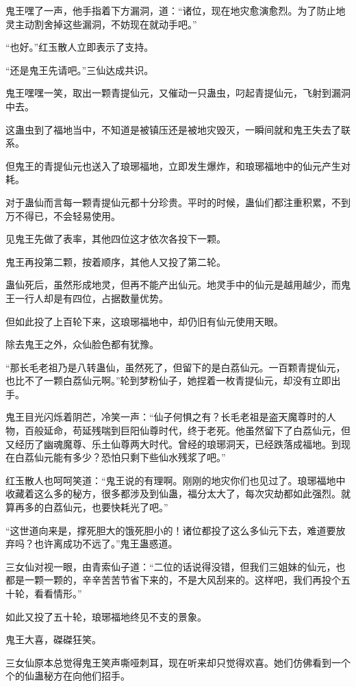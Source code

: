 \begin{this_body}
鬼王嘿了一声，他手指着下方漏洞，道：“诸位，现在地灾愈演愈烈。为了防止地灵主动割舍掉这些漏洞，不妨现在就动手吧。”

“也好。”红玉散人立即表示了支持。

“还是鬼王先请吧。”三仙达成共识。

鬼王嘿嘿一笑，取出一颗青提仙元，又催动一只蛊虫，叼起青提仙元，飞射到漏洞中去。

这蛊虫到了福地当中，不知道是被镇压还是被地灾毁灭，一瞬间就和鬼王失去了联系。

但鬼王的青提仙元也送入了琅琊福地，立即发生爆炸，和琅琊福地中的仙元产生对耗。

对于蛊仙而言每一颗青提仙元都十分珍贵。平时的时候，蛊仙们都注重积累，不到万不得已，不会轻易使用。

见鬼王先做了表率，其他四位这才依次各投下一颗。

鬼王再投第二颗，按着顺序，其他人又投了第二轮。

蛊仙死后，虽然形成地灵，但再不能产出仙元。地灵手中的仙元是越用越少，而鬼王一行人却是有四位，占据数量优势。

但如此投了上百轮下来，这琅琊福地中，却仍旧有仙元使用天眼。

除去鬼王之外，众仙脸色都有犹豫。

“那长毛老祖乃是八转蛊仙，虽然死了，但留下的是白荔仙元。一百颗青提仙元，也比不了一颗白荔仙元啊。”轮到梦粉仙子，她捏着一枚青提仙元，却没有立即出手。

鬼王目光闪烁着阴芒，冷笑一声：“仙子何惧之有？长毛老祖是盗天魔尊时的人物，百般延命，苟延残喘到巨阳仙尊时代，终于老死。他虽然留下了白荔仙元，但又经历了幽魂魔尊、乐土仙尊两大时代。曾经的琅琊洞天，已经跌落成福地。到现在白荔仙元能有多少？恐怕只剩下些仙水残浆了吧。”

红玉散人也呵呵笑道：“鬼王说的有理啊。刚刚的地灾你们也见过了。琅琊福地中收藏着这么多的秘方，很多都涉及到仙蛊，福分太大了，每次灾劫都如此强烈。就算再多的白荔仙元，也要快耗光了吧。”

“这世道向来是，撑死胆大的饿死胆小的！诸位都投了这么多仙元下去，难道要放弃吗？也许离成功不远了。”鬼王蛊惑道。

三女仙对视一眼，由青索仙子道：“二位的话说得没错，但我们三姐妹的仙元，也都是一颗一颗的，辛辛苦苦节省下来的，不是大风刮来的。这样吧，我们再投个五十轮，看看情形。”

如此又投了五十轮，琅琊福地终见不支的景象。

鬼王大喜，磔磔狂笑。

三女仙原本总觉得鬼王笑声嘶哑刺耳，现在听来却只觉得欢喜。她们仿佛看到一个个的仙蛊秘方在向他们招手。


\end{this_body}
